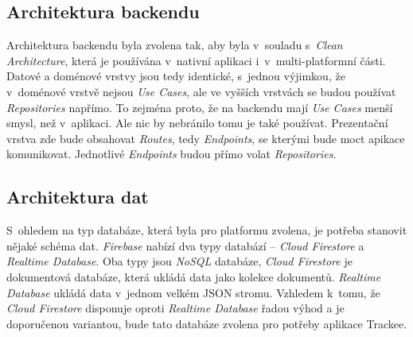 \subsection{Architektura backendu}

Architektura backendu byla zvolena tak, aby byla v~souladu s~\emph{Clean Architecture}, která je používána v~nativní aplikaci i~v~multi-platformní části. Datové a doménové vrstvy jsou tedy identické, s~jednou výjimkou, že v~doménové vrstvě nejsou \emph{Use Cases}, ale ve vyšších vrstvách se budou používat \emph{Repositories} napřímo. To zejména proto, že na backendu mají \emph{Use Cases} menší smysl, než v~aplikaci. Ale nic by nebránilo tomu je také používat. Prezentační vrstva zde bude obsahovat \emph{Routes}, tedy \emph{Endpoints}, se kterými bude moct apikace komunikovat. Jednotlivé \emph{Endpoints} budou přímo volat \emph{Repositories}.

\subsection{Architektura dat}

S~ohledem na typ databáze, která byla pro platformu zvolena, je potřeba stanovit nějaké schéma dat. \emph{Firebase} nabízí dva typy databází – \emph{Cloud Firestore} a \emph{Realtime Database}. Oba typy jsou \emph{NoSQL} databáze, \emph{Cloud Firestore} je dokumentová databáze, která ukládá data jako kolekce dokumentů. \emph{Realtime Database} ukládá data v~jednom velkém JSON stromu. Vzhledem k~tomu, že \emph{Cloud Firestore} disponuje oproti \emph{Realtime Database} řadou výhod a je doporučenou variantou, bude tato databáze zvolena pro potřeby aplikace Trackee. \cite{rtdb-vs-firestore}

